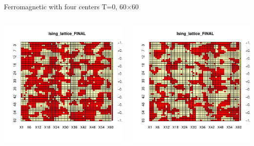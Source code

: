 \documentclass{beamer}
\begin{document}
\begin{frame}{Ferromagnetic with four centers T=0,  60$\times$60}
\begin{columns}
\begin{column}{0.5\textwidth}
    \begin{center}
     \includegraphics[width=\textwidth]{Pic/J+1_60_10000_four_center_T=0_FINAL.pdf}
     \end{center}
\end{column}
\begin{column}{0.5\textwidth}
    \begin{center}
     \includegraphics[width=\textwidth]{Pic/J+1_60_10000_T=0_2_FINAL.pdf}
     \end{center}
\end{column}
\end{columns}
\end{frame}
\end{document}
